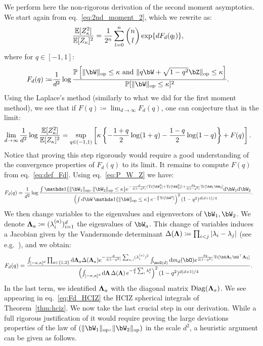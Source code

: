 We perform here the non-rigorous derivation of the second moment asymptotics.
We start again from eq.~\eqref{eq:2nd_moment_2}, which we rewrite as:
\begin{align*}
    \frac{\mathbb{E}[Z_\kappa^2]}{\mathbb{E}[Z_\kappa]^2} &= \frac{1}{2^n} \sum_{l=0}^n \binom{n}{l} \exp\{d F_d(q_l)\}, 
\end{align*}
where for $q \in [-1,1]$:
\begin{align}\label{eq:def_Fd}
    F_d(q) \coloneqq&  
    \frac{1}{d^2} \log \frac{\bbP\left[\|\bW\|_\op \leq \kappa \textrm{ and } \|q \bW + \sqrt{1-q^2} \bZ\|_\op \leq \kappa\right]}{\bbP[\|\bW\|_\op \leq \kappa]^2}.
\end{align}
Using the Laplace's method (similarly to what we did for the first moment method), 
we see that if $F(q) \coloneqq \lim_{d \to \infty} F_d(q)$, one can conjecture that in the limit:
\begin{align}\label{eq:asympt_2nd_moment_1}
    \lim_{d \to \infty} \frac{1}{d^2} \log \frac{\mathbb{E}[Z_\kappa^2]}{\mathbb{E}[Z_\kappa]^2} &= \sup_{q \in (-1,1)} \left[\kappa \left\{- \frac{1+q}{2} \log (1+q) - \frac{1-q}{2} \log (1-q) \right\}+ F(q)\right].
\end{align}
Notice that proving this step rigorously would require a good understanding of the convergence properties of $F_d(q)$ to its limit.
It remains to compute $F(q)$ from eq.~\eqref{eq:def_Fd}.
Using eq.~\eqref{eq:P_W_Z} we have:
\begin{align*}
    F_d(q) &= \frac{1}{d^2} \log \frac{\int \indi\{\|\bW_1\|_\op, \|\bW_2\|_\op \leq \kappa\} e^{-\frac{d}{4(1-q^2)} (\Tr[\bW_1^2] + \Tr[\bW_2^2]) + \frac{dq}{2(1-q^2)} \Tr[\bW_1 \bW_2]} \rd \bW_1 \rd \bW_2}{\left(\int \rd \bW \, \indi\{\|\bW \|_\op \leq \kappa\} \, e^{-\frac{d}{4}\Tr[\bW^2]}\right)^2 (1-q^2)^{d(d+1)/4}}.
\end{align*}
We then change variables to the eigenvalues and eigenvectors of $\bW_1, \bW_2$. 
We denote ${\boldsymbol{\Lambda}}_a \coloneqq (\lambda_i^{(a)})_{i=1}^d$ the eigenvalues of $\bW_a$.
This change of variables induces a Jacobian given by the Vandermonde determinant 
$\Delta({\boldsymbol{\Lambda}}) \coloneqq \prod_{i < j} |\lambda_i - \lambda_j|$ (see e.g.\ \cite{anderson2010introduction}), and we 
obtain:
\begin{align}\label{eq:Fd_HCIZ}
    F_d(q) &= \frac{\int_{[- \kappa, \kappa]^d} \prod_{a \in \{1, 2\}} \rd \bLambda_a \Delta(\bLambda_a) e^{-\frac{d}{4(1-q^2)} \sum_{a,i} (\lambda_i^{(a)})^2} \int_{\mcO(d)} \rd m_d (\bO) e^{\frac{dq}{2(1-q^2)} \Tr[\bO \bLambda_1 \bO^\T \bLambda_2]}}{\left(\int_{[-\kappa,\kappa]^d} \rd \bLambda \, \Delta(\bLambda) \, e^{-\frac{d}{4}\sum_i \lambda_i^2}\right)^2 (1-q^2)^{d(d+1)/4}}.
\end{align}
In the last term, we identified ${\boldsymbol{\Lambda}}_a$ with the diagonal matrix $\mathrm{Diag}({\boldsymbol{\Lambda}}_a)$.
We see appearing in eq.~\eqref{eq:Fd_HCIZ} the HCIZ spherical integrals of Theorem~\ref{thm:hciz}.
We now take the last crucial step in our derivation. While a full rigorous justification of it would require proving the large deviations properties of the law of 
$(\|\bW_1\|_\op, \|\bW_2\|_\op)$ in the scale $d^2$, a heuristic argument can be given as follows.

